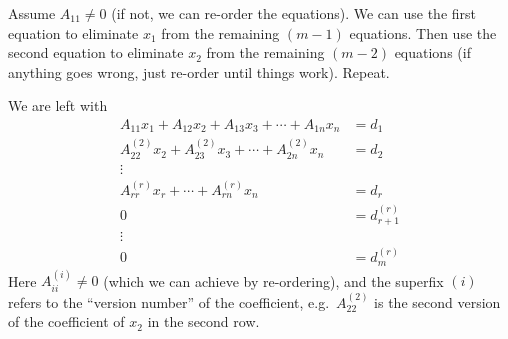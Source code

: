 \documentclass[a4paper]{article}
\begin{document}
Assume $A_{11}\not=0$ (if not, we can re-order the equations). We can use the first equation to eliminate $x_1$ from the remaining $(m - 1)$ equations. Then use the second equation to eliminate $x_2$ from the remaining $(m - 2)$ equations (if anything goes wrong, just re-order until things work). Repeat.

We are left with
\begin{align*}
  A_{11}x_1 + A_{12}x_2 + A_{13}x_3 + \cdots + A_{1n}x_n &= d_1\\
  A_{22}^{(2)}x_2 + A_{23}^{(2)}x_3 + \cdots + A_{2n}^{(2)}x_n &= d_2\\
  \vdots&\\
  A_{rr}^{(r)}x_r + \cdots + A_{rn}^{(r)}x_n &= d_r\\
  0 &= d_{r + 1}^{(r)}\\
  \vdots&\\
  0 &= d_{m}^{(r)}
\end{align*}
Here $A_{ii}^{(i)} \not=0$ (which we can achieve by re-ordering), and the superfix $(i)$ refers to the ``version number'' of the coefficient, e.g.\ $A_{22}^{(2)}$ is the second version of the coefficient of $x_2$ in the second row.
\end{document}

